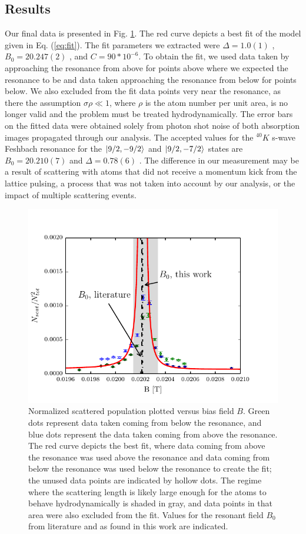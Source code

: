 \documentclass[12pt]{iopart}
\begin{document}
\subsection{Results}
Our final data is presented in Fig. \ref{fig:fittedFractions}. The red curve depicts a best fit of the model given in Eq. (\ref{eq:fit}). The fit parameters we extracted were $\Delta = 1.0(1)$  \mT{}, $B_0 = 20.247(2)$  \mT{}, and $C=90*10^{-6}$. To obtain the fit, we used data taken by approaching the resonance from above for points above where we expected the resonance to be and data taken approaching the resonance from below for points below. We also excluded from the fit data points very near the resonance, as there the assumption $\sigma\rho\ll1$, where $\rho$ is the atom number per unit area, is no longer valid and the problem must be treated hydrodynamically. The error bars on the fitted data were obtained solely from photon shot noise of both absorption images propagated through our analysis.
The accepted values for the $^{40}K$ s-wave Feshbach resonance for the  $\mathinner{|{9/2,-9/2}\rangle}$ and $\mathinner{|{9/2,-7/2}\rangle}$ states are $B_0=20.210(7)$  \mT{} and $\Delta=0.78(6)$  \mT{} \cite{Regal04}. The difference in our measurement may be a result of scattering with atoms that did not receive a momentum kick from the lattice pulsing, a process that was not taken into account by our analysis, or the impact of multiple scattering events.
\begin{figure}
	\includegraphics{figure11.pdf}
\caption{Normalized scattered population plotted versus bias field $B$. Green dots represent data taken coming from below the resonance, and blue dots represent the data taken coming from above the resonance. The red curve depicts the best fit, where data coming from above the resonance was used above the resonance and data coming from below the resonance was used below the resonance to create the fit; the unused data points are indicated by hollow dots. The regime where the scattering length is likely large enough for the atoms to behave hydrodynamically is shaded in gray, and data points in that area were also excluded from the fit. Values for the resonant field $B_0$ from literature and as found in this work are indicated.    }
\label{fig:fittedFractions}
\end{figure}
\end{document}
